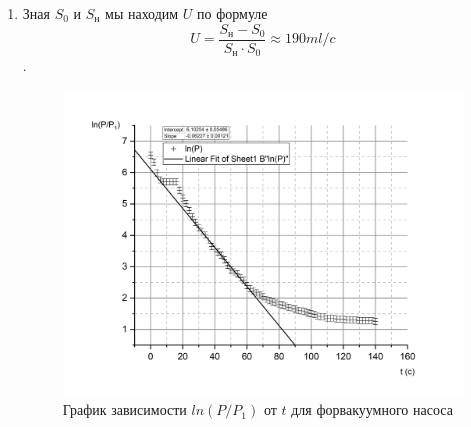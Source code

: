 \documentclass[a4paper, 12pt]{article}%
\begin{document}
\begin{enumerate}
\item Зная $S_0$ и $S_{\text{н}}$ мы находим $U$ по формуле 
\[U = \dfrac{S_{\text{н}} - S_0}{S_{\text{н}} \cdot S_0} \approx 190 ml/c\]
.
\begin{figure}[h]
\includegraphics[width = \textwidth]{231_4.jpg}
\caption{График зависимости $ln(P/P_1)$ от $t$ для форвакуумного насоса}
\end{figure}
\end{enumerate}
\end{document}
